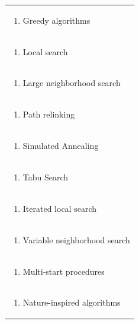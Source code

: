 \documentclass[11pt]{article}
\begin{document}
\begin{center}
\begin{longtable}{|p{4cm}|p{4cm}|p{4cm}|p{4cm}|}
\multicolumn{4}{|p{\dimexpr 16cm + 6\tabcolsep\relax}|}{\begin{enumerate}[start=2]\item Greedy algorithms\end{enumerate}}\\
\multicolumn{4}{|p{\dimexpr 16cm + 6\tabcolsep\relax}|}{\begin{enumerate}[start=3]\item Local search\end{enumerate}}\\
\multicolumn{4}{|p{\dimexpr 16cm + 6\tabcolsep\relax}|}{\begin{enumerate}[start=4]\item Large neighborhood search\end{enumerate}}\\
\multicolumn{4}{|p{\dimexpr 16cm + 6\tabcolsep\relax}|}{\begin{enumerate}[start=5]\item Path relinking\end{enumerate}}\\
\multicolumn{4}{|p{\dimexpr 16cm + 6\tabcolsep\relax}|}{\begin{enumerate}[start=6]\item Simulated Annealing\end{enumerate}}\\
\multicolumn{4}{|p{\dimexpr 16cm + 6\tabcolsep\relax}|}{\begin{enumerate}[start=7]\item Tabu Search\end{enumerate}}\\
\multicolumn{4}{|p{\dimexpr 16cm + 6\tabcolsep\relax}|}{\begin{enumerate}[start=8]\item Iterated local search\end{enumerate}}\\
\multicolumn{4}{|p{\dimexpr 16cm + 6\tabcolsep\relax}|}{\begin{enumerate}[start=9]\item Variable neighborhood search\end{enumerate}}\\
\multicolumn{4}{|p{\dimexpr 16cm + 6\tabcolsep\relax}|}{\begin{enumerate}[start=10]\item Multi-start procedures\end{enumerate}}\\
\multicolumn{4}{|p{\dimexpr 16cm + 6\tabcolsep\relax}|}{\begin{enumerate}[start=11]\item Nature-inspired algorithms\end{enumerate}}\\

\end{longtable}
\end{center}
\end{document}
